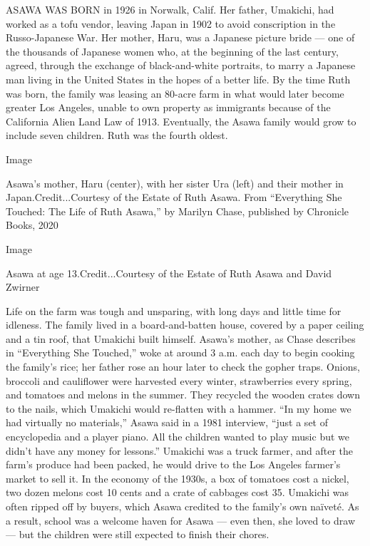 ASAWA WAS BORN in 1926 in Norwalk, Calif. Her father, Umakichi, had
worked as a tofu vendor, leaving Japan in 1902 to avoid conscription in
the Russo-Japanese War. Her mother, Haru, was a Japanese picture bride
--- one of the thousands of Japanese women who, at the beginning of the
last century, agreed, through the exchange of black-and-white portraits,
to marry a Japanese man living in the United States in the hopes of a
better life. By the time Ruth was born, the family was leasing an
80-acre farm in what would later become greater Los Angeles, unable to
own property as immigrants because of the California Alien Land Law of
1913. Eventually, the Asawa family would grow to include seven children.
Ruth was the fourth oldest.

Image

Asawa's mother, Haru (center), with her sister Ura (left) and their
mother in Japan.Credit...Courtesy of the Estate of Ruth Asawa. From
``Everything She Touched: The Life of Ruth Asawa,'' by Marilyn Chase,
published by Chronicle Books, 2020

Image

Asawa at age 13.Credit...Courtesy of the Estate of Ruth Asawa and David
Zwirner

Life on the farm was tough and unsparing, with long days and little time
for idleness. The family lived in a board-and-batten house, covered by a
paper ceiling and a tin roof, that Umakichi built himself. Asawa's
mother, as Chase describes in ``Everything She Touched,'' woke at around
3 a.m. each day to begin cooking the family's rice; her father rose an
hour later to check the gopher traps. Onions, broccoli and cauliflower
were harvested every winter, strawberries every spring, and tomatoes and
melons in the summer. They recycled the wooden crates down to the nails,
which Umakichi would re-flatten with a hammer. ``In my home we had
virtually no materials,'' Asawa said in a 1981 interview, ``just a set
of encyclopedia and a player piano. All the children wanted to play
music but we didn't have any money for lessons.'' Umakichi was a truck
farmer, and after the farm's produce had been packed, he would drive to
the Los Angeles farmer's market to sell it. In the economy of the 1930s,
a box of tomatoes cost a nickel, two dozen melons cost 10 cents and a
crate of cabbages cost 35. Umakichi was often ripped off by buyers,
which Asawa credited to the family's own naïveté. As a result, school
was a welcome haven for Asawa --- even then, she loved to draw --- but
the children were still expected to finish their chores.

